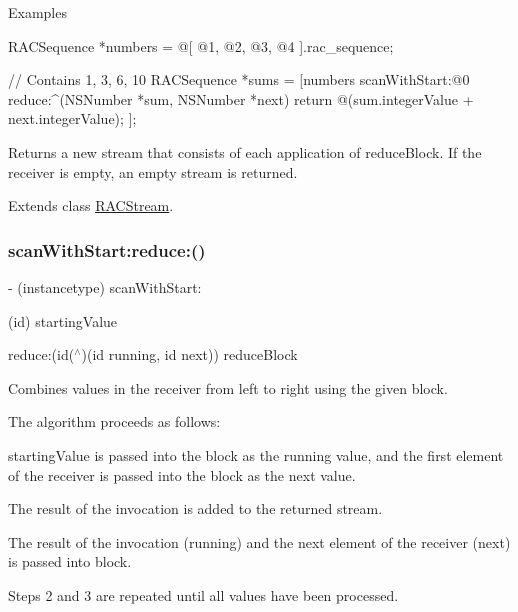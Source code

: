 Examples \begin{DoxyVerb} RACSequence *numbers = @[ @1, @2, @3, @4 ].rac_sequence;

 // Contains 1, 3, 6, 10
 RACSequence *sums = [numbers scanWithStart:@0 reduce:^(NSNumber *sum, NSNumber *next) {
     return @(sum.integerValue + next.integerValue);
 }];
\end{DoxyVerb}


Returns a new stream that consists of each application of {\ttfamily reduce\+Block}. If the receiver is empty, an empty stream is returned. 

Extends class \mbox{\hyperlink{interface_r_a_c_stream_aa86990e9bc4cbc3dff2815f56b907b41}{R\+A\+C\+Stream}}.

\mbox{\label{category_r_a_c_stream_07_operations_08_aa86990e9bc4cbc3dff2815f56b907b41}} 
\subsubsection{\texorpdfstring{scan\+With\+Start\+:reduce\+:()}{scanWithStart:reduce:()}\hspace{0.1cm}{\footnotesize\ttfamily [3/3]}}
{\footnotesize\ttfamily -\/ (instancetype) scan\+With\+Start\+: \begin{DoxyParamCaption}\item[{(id)}]{starting\+Value }\item[{reduce:(id($^\wedge$)(id running, id next))}]{reduce\+Block }\end{DoxyParamCaption}}

Combines values in the receiver from left to right using the given block.

The algorithm proceeds as follows\+:


\begin{DoxyEnumerate}
\item {\ttfamily starting\+Value} is passed into the block as the {\ttfamily running} value, and the first element of the receiver is passed into the block as the {\ttfamily next} value.
\item The result of the invocation is added to the returned stream.
\item The result of the invocation ({\ttfamily running}) and the next element of the receiver ({\ttfamily next}) is passed into {\ttfamily block}.
\item Steps 2 and 3 are repeated until all values have been processed.
\end{DoxyEnumerate}

